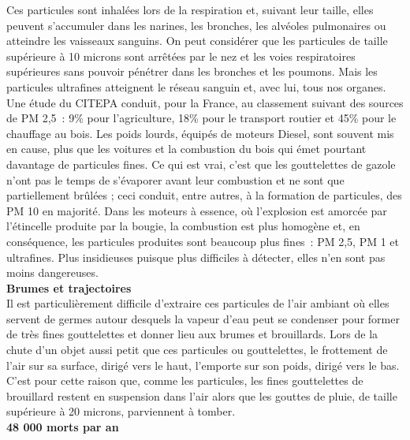 \documentclass[8pt]{article}
\begin{document}
Ces particules sont inhalées lors de la respiration et, suivant leur taille, elles peuvent s’accumuler dans les narines, les bronches, les alvéoles pulmonaires ou atteindre les vaisseaux sanguins. On peut considérer que les particules de taille supérieure à 10 microns sont arrêtées par le nez et les voies respiratoires supérieures sans pouvoir pénétrer dans les bronches et les poumons. Mais les particules ultrafines atteignent le réseau sanguin et, avec lui, tous nos organes.
Une étude du CITEPA conduit, pour la France, au classement suivant des sources de PM 2,5~: 9\% pour l’agriculture, 18\% pour le transport routier et 45\% pour le chauffage au bois. Les poids lourds, équipés de moteurs Diesel, sont souvent mis en cause, plus que les voitures et la combustion du bois qui émet pourtant davantage de particules fines. Ce qui est vrai, c’est que les gouttelettes de gazole n’ont pas le temps de s’évaporer avant leur combustion et ne sont que partiellement brûlées ; ceci conduit, entre autres, à la formation de particules, des PM 10 en majorité.
Dans les moteurs à essence, où l’explosion est amorcée par l’étincelle produite par la bougie, la combustion est plus homogène et, en conséquence, les particules produites sont beaucoup plus fines~: PM 2,5, PM 1 et ultrafines. Plus insidieuses puisque plus difficiles à détecter, elles n’en sont pas moins dangereuses.\\

\textbf{Brumes et trajectoires}\\

Il est particulièrement difficile d’extraire ces particules de l’air ambiant où elles servent de germes autour desquels la vapeur d’eau peut se condenser pour former de très fines gouttelettes et donner lieu aux brumes et brouillards.
Lors de la chute d’un objet aussi petit que ces particules ou gouttelettes, le frottement de l’air sur sa surface, dirigé vers le haut, l’emporte sur son poids, dirigé vers le bas. C’est pour cette raison que, comme les particules, les fines gouttelettes de brouillard restent en suspension dans l’air alors que les gouttes de pluie, de taille supérieure à 20 microns, parviennent à tomber.\\

\textbf{48 000 morts par an}\\
\end{document}

